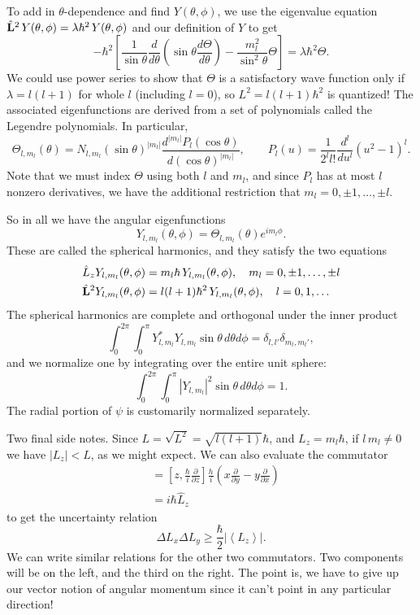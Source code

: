 \documentclass[../p052main.tex]{subfiles}
\begin{document}
To add in $\theta$-dependence and find $Y(\theta, \phi)$, we use the eigenvalue equation $\hat{\mathbf{L}}^2 \,Y(\theta, \phi) = \lambda \hbar^2 \,Y(\theta, \phi)$ and our definition of $Y$ to get
\[ -\hbar^2 \left[ \frac{1}{\sin \theta} \frac{d}{d\theta} \left( \sin \theta \frac{d\Theta}{d\theta} \right) - \frac{m_l^2}{\sin^2 \theta} \Theta \right] = \lambda \hbar^2 \Theta. \]
We could use power series to show that $\Theta$ is a satisfactory wave function only if $\lambda = l(l + 1)$ for whole $l$ (including $l=0$), so $L^2 = l(l+1)\hbar^2$ is quantized! %
The associated eigenfunctions are derived from a set of polynomials called the Legendre polynomials.
In particular,
\[ \Theta_{l,m_l}(\theta) = N_{l,m_l}(\sin \theta)^{|m_l|} \frac{d^{|m_l|} P_l(\cos\theta)}{d(\cos \theta)^{|m_l|}}, \qquad P_l(u) = \frac{1}{2^l l!} \frac{d^l}{du^l} (u^2 - 1)^l. \]
Note that we must index $\Theta$ using both $l$ and $m_l$, and since $P_l$ has at most $l$ nonzero derivatives, we have the additional restriction that $m_l = 0, \pm 1, \ldots, \pm l$.

So in all we have the angular eigenfunctions
\[ Y_{l, m_l} (\theta, \phi) = \Theta_{l, m_l}(\theta) e^{im_l \phi}. \]
These are called the spherical harmonics, and they satisfy the two equations
\begin{align*}
    \hat L_z Y_{l,m_l} (\theta, \phi) &= m_l \hbar \, Y_{l,m_l} (\theta, \phi), \quad m_l = 0, \pm 1, \ldots, \pm l \\
    \hat{\mathbf{L}}^2 Y_{l,m_l} (\theta, \phi) &= l(l+1)\hbar^2 \, Y_{l,m_l} (\theta, \phi), \quad l = 0, 1, \ldots
\end{align*}
The spherical harmonics are complete and orthogonal under the inner product
\[ \int_{0}^{2\pi} \int_{0}^{\pi} Y^*_{l,m_l} Y_{l,m_l} \sin\theta \,d\theta d\phi = \delta_{l,l'} \delta_{m_l,m_l'}, \]
and we normalize one by integrating over the entire unit sphere:
\[ \int_{0}^{2\pi} \int_{0}^{\pi} |Y_{l,m_l}|^2 \sin \theta \,d\theta d\phi = 1. \]
The radial portion of $\psi$ is customarily normalized separately.

Two final side notes.
Since $L = \sqrt{L^2} = \sqrt{l(l+1)}\hbar$, and $L_z = m_l \hbar$, if $l \,m_l \neq 0$ we have $|L_z| < L$, as we might expect.
We can also evaluate the commutator
\begin{align*}
    [\hat L_x, \hat L_y] &= \left[ z, \frac{\hbar}{i} \frac{\partial}{\partial z} \right] \frac{h}{i} \left( x \frac{\partial}{\partial y} - y \frac{\partial}{\partial x} \right) \\
    &= i\hbar \hat L_z
\end{align*}
to get the uncertainty relation
\[ \Delta L_x \Delta L_y \geq \frac{\hbar}{2} \left| \left< L_z \right> \right|. \]
We can write similar relations for the other two commutators.
Two components will be on the left, and the third on the right.
The point is, we have to give up our vector notion of angular momentum since it can't point in any particular direction!
\end{document}

